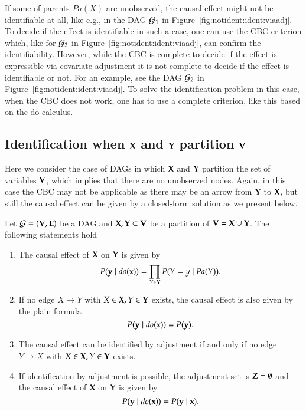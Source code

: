 If some of parents $\textit{Pa}(X)$ are unobserved, the causal effect might not be identifiable at all, 
like e.g., in the DAG ${\cal G}_1$ in Figure~\ref{fig:notident:ident:viaadj}.
To decide if the effect is identifiable in such a case, one can use the CBC
criterion which, like for ${\cal G}_3$ in Figure~\ref{fig:notident:ident:viaadj}, 
can confirm the identifiability. However, while the CBC is complete 
to decide if the effect is expressible via covariate adjustment 
it is not complete to decide if the effect is identifiable or not.
For an example, see the DAG ${\cal G}_2$  in Figure~\ref{fig:notident:ident:viaadj}.
To solve the identification problem in this case, when the CBC does not work, 
one has to use a complete criterion, like this based on the do-calculus.

\subsection{Identification when ${\bf X}$ and ${\bf Y}$ partition ${\bf V}$}\label{sec:special:case:v:partition}

Here we consider the case of DAGs in which ${\bf X}$ and ${\bf Y}$ partition the set of variables ${\bf V}$, which
implies that there are no unobserved nodes.
%
Again, in this case the CBC may not be applicable as there may be an arrow from ${\bf Y}$ to ${\bf X}$, but still 
the causal effect can be given by a closed-form solution as we present below.

\begin{lemma}
Let $ {\cal G} = ({\bf V}, {\bf E}) $ be a DAG and $ {\bf X}, {\bf Y} \subset {\bf V}  $ be 
a partition of $ {\bf V} = {\bf X} \cup {\bf Y} $. The following statements hold

\begin{enumerate}[$(a)$] %
\item The causal effect of $ {\bf X}  $ on $ {\bf Y} $ is given by
\[ 
  P({\bf y} \mid \textit{do}({\bf x})) = \prod\limits_{Y\in{\bf Y}} P(Y = y \mid \textit{Pa}(Y) ). 
\]
\item If no edge $ X \to Y $ with  $X \in {\bf X}, Y \in {\bf Y} $ exists, the causal effect is also given by the plain formula
\[ 
  P({\bf y} \mid \textit{do}({\bf x})) = P({\bf y}). 
\]
\item The causal effect can be identified by adjustment if and only if no edge $ Y \to X $ with  $X \in {\bf X}, Y \in {\bf Y} $ exists. 
\item If identification by adjustment is possible, the adjustment set is $ {\bf Z} = \emptyset $ and the causal effect of $ {\bf X} $ on $ {\bf Y} $ is given by
\[ 
  P({\bf y} \mid \textit{do}({\bf x})) = P({\bf y} \mid {\bf x} ).
\]
\end{enumerate}
\end{lemma}

